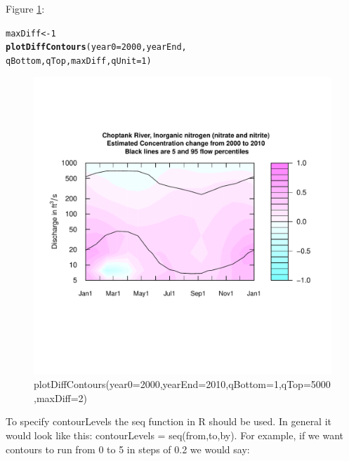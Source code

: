 \documentclass[a4paper,11pt]{article}\usepackage[]{graphicx}\usepackage[]{color}
\makeatletter
\newcommand{\hlnum}[1]{\textcolor[rgb]{0.686,0.059,0.569}{#1}}%
\newcommand{\hlstd}[1]{\textcolor[rgb]{0.345,0.345,0.345}{#1}}%
\newcommand{\hlkwb}[1]{\textcolor[rgb]{0.69,0.353,0.396}{#1}}%
\newcommand{\hlkwc}[1]{\textcolor[rgb]{0.333,0.667,0.333}{#1}}%
\newcommand{\hlkwd}[1]{\textcolor[rgb]{0.737,0.353,0.396}{\textbf{#1}}}%
\newenvironment{kframe}{%
 \def\at@end@of@kframe{}%
 \ifinner\ifhmode%
  \def\at@end@of@kframe{\end{minipage}}%
  \begin{minipage}{\columnwidth}%
 \fi\fi%
 \def\FrameCommand##1{\hskip\@totalleftmargin \hskip-\fboxsep
 \colorbox{shadecolor}{##1}\hskip-\fboxsep
     \hskip-\linewidth \hskip-\@totalleftmargin \hskip\columnwidth}%
 \MakeFramed {\advance\hsize-\width
   \@totalleftmargin\z@ \linewidth\hsize
   \@setminipage}}%
 {\par\unskip\endMakeFramed%
 \at@end@of@kframe}
\newenvironment{knitrout}{}{} %
\makeatother
\begin{document}
Figure \ref{fig:plotDiffContours}:
\begin{knitrout}
\color{fgcolor}\begin{kframe}
\begin{alltt}
\hlstd{maxDiff}\hlkwb{<-}\hlnum{1}
\hlkwd{plotDiffContours}\hlstd{(}\hlkwc{year0}\hlstd{=}\hlnum{2000}\hlstd{,yearEnd,}
                 \hlstd{qBottom,qTop,maxDiff,}\hlkwc{qUnit}\hlstd{=}\hlnum{1}\hlstd{)}
\end{alltt}
\end{kframe}\begin{figure}[]

\includegraphics[width=1\linewidth,height=1\linewidth]{figure/plotDiffContours} \caption[plotDiffContours(year0=2000,yearEnd=2010,qBottom=1,qTop=5000,maxDiff=2)]{plotDiffContours(year0=2000,yearEnd=2010,qBottom=1,qTop=5000,maxDiff=2)\label{fig:plotDiffContours}}
\end{figure}


\end{knitrout}



To specify contourLevels the seq function in R should be used.  In general it would look like this: contourLevels = seq(from,to,by).  For example, if we want contours to run from 0 to 5 in steps of 0.2 we would say:  
\end{document}
